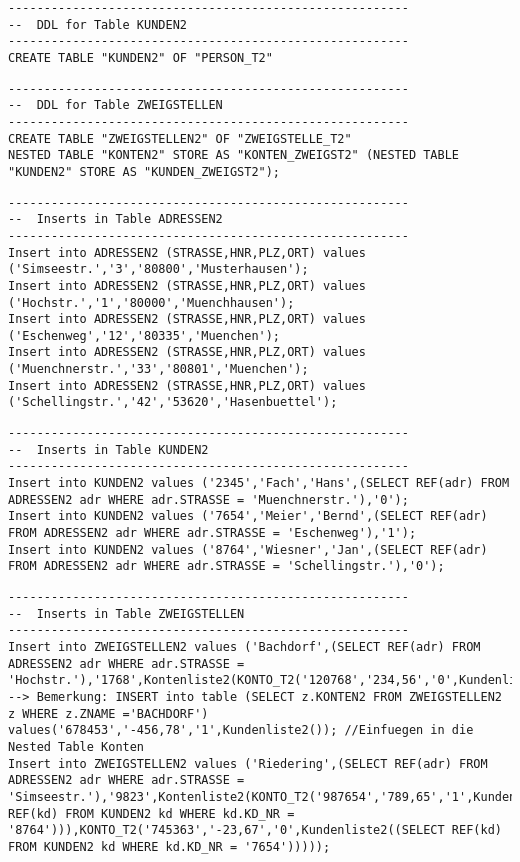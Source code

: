 \documentclass{scrartcl}
\begin{document}
\begin{lstlisting}
--------------------------------------------------------
--  DDL for Table KUNDEN2
--------------------------------------------------------
CREATE TABLE "KUNDEN2" OF "PERSON_T2" 
\end{lstlisting}
\begin{lstlisting}
--------------------------------------------------------
--  DDL for Table ZWEIGSTELLEN
--------------------------------------------------------
CREATE TABLE "ZWEIGSTELLEN2" OF "ZWEIGSTELLE_T2" 
NESTED TABLE "KONTEN2" STORE AS "KONTEN_ZWEIGST2" (NESTED TABLE "KUNDEN2" STORE AS "KUNDEN_ZWEIGST2");
\end{lstlisting}
\begin{landscape}
\begin{lstlisting}
--------------------------------------------------------
--  Inserts in Table ADRESSEN2
--------------------------------------------------------
Insert into ADRESSEN2 (STRASSE,HNR,PLZ,ORT) values ('Simseestr.','3','80800','Musterhausen');
Insert into ADRESSEN2 (STRASSE,HNR,PLZ,ORT) values ('Hochstr.','1','80000','Muenchhausen');
Insert into ADRESSEN2 (STRASSE,HNR,PLZ,ORT) values ('Eschenweg','12','80335','Muenchen');
Insert into ADRESSEN2 (STRASSE,HNR,PLZ,ORT) values ('Muenchnerstr.','33','80801','Muenchen');
Insert into ADRESSEN2 (STRASSE,HNR,PLZ,ORT) values ('Schellingstr.','42','53620','Hasenbuettel');
\end{lstlisting}
\begin{lstlisting}
--------------------------------------------------------
--  Inserts in Table KUNDEN2
--------------------------------------------------------
Insert into KUNDEN2 values ('2345','Fach','Hans',(SELECT REF(adr) FROM ADRESSEN2 adr WHERE adr.STRASSE = 'Muenchnerstr.'),'0');
Insert into KUNDEN2 values ('7654','Meier','Bernd',(SELECT REF(adr) FROM ADRESSEN2 adr WHERE adr.STRASSE = 'Eschenweg'),'1');
Insert into KUNDEN2 values ('8764','Wiesner','Jan',(SELECT REF(adr) FROM ADRESSEN2 adr WHERE adr.STRASSE = 'Schellingstr.'),'0');
\end{lstlisting}
\begin{lstlisting}
--------------------------------------------------------
--  Inserts in Table ZWEIGSTELLEN
--------------------------------------------------------
Insert into ZWEIGSTELLEN2 values ('Bachdorf',(SELECT REF(adr) FROM ADRESSEN2 adr WHERE adr.STRASSE = 'Hochstr.'),'1768',Kontenliste2(KONTO_T2('120768','234,56','0',Kundenliste2()),KONTO_T2('348973','12567,56','1',Kundenliste2()),KONTO_T2('678453','-456,78','1',Kundenliste2())));
--> Bemerkung: INSERT into table (SELECT z.KONTEN2 FROM ZWEIGSTELLEN2 z WHERE z.ZNAME ='BACHDORF') values('678453','-456,78','1',Kundenliste2()); //Einfuegen in die Nested Table Konten
Insert into ZWEIGSTELLEN2 values ('Riedering',(SELECT REF(adr) FROM ADRESSEN2 adr WHERE adr.STRASSE = 'Simseestr.'),'9823',Kontenliste2(KONTO_T2('987654','789,65','1',Kundenliste2((SELECT REF(kd) FROM KUNDEN2 kd WHERE kd.KD_NR = '8764'))),KONTO_T2('745363','-23,67','0',Kundenliste2((SELECT REF(kd) FROM KUNDEN2 kd WHERE kd.KD_NR = '7654')))));


\end{lstlisting}
\end{landscape}
\end{document}
